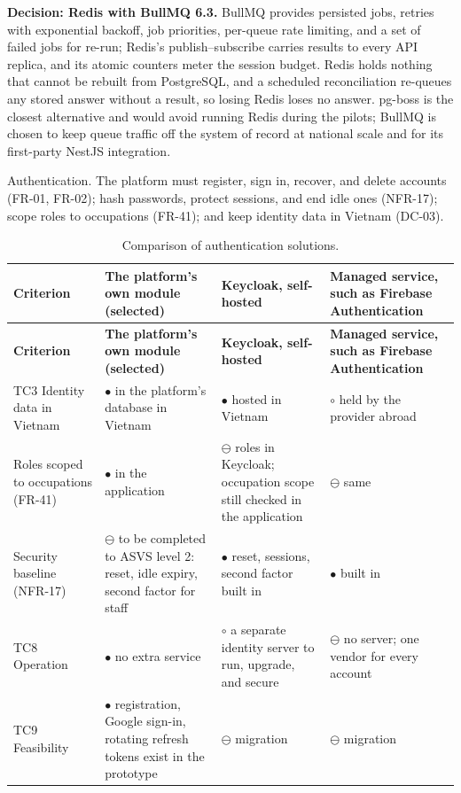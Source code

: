 \textbf{Decision: Redis with BullMQ 6.3.} BullMQ provides persisted jobs, retries with exponential backoff, job priorities, per-queue rate limiting, and a set of failed jobs for re-run\cite{r154}; Redis's publish--subscribe carries results to every API replica, and its atomic counters meter the session budget. Redis holds nothing that cannot be rebuilt from PostgreSQL, and a scheduled reconciliation re-queues any stored answer without a result, so losing Redis loses no answer. pg-boss is the closest alternative and would avoid running Redis during the pilots; BullMQ is chosen to keep queue traffic off the system of record at national scale and for its first-party NestJS integration.

Authentication. The platform must register, sign in, recover, and delete accounts (FR-01, FR-02); hash passwords, protect sessions, and end idle ones (NFR-17); scope roles to occupations (FR-41); and keep identity data in Vietnam (DC-03).

{\small
\begin{longtable}{|>{\raggedright\arraybackslash}p{}|>{\raggedright\arraybackslash}p{}|>{\raggedright\arraybackslash}p{}|>{\raggedright\arraybackslash}p{}|}
\caption{Comparison of authentication solutions.} \\
\hline
\textbf{Criterion} & \textbf{The platform's own module (selected)} & \textbf{Keycloak, self-hosted\cite{r186}} & \textbf{Managed service, such as Firebase Authentication\cite{r187}} \\ \hline
\endfirsthead
\hline
\textbf{Criterion} & \textbf{The platform's own module (selected)} & \textbf{Keycloak, self-hosted\cite{r186}} & \textbf{Managed service, such as Firebase Authentication\cite{r187}} \\ \hline
\endhead
TC3 Identity data in Vietnam & $\bullet$ in the platform's database in Vietnam & $\bullet$ hosted in Vietnam & $\circ$ held by the provider abroad \\ \hline
Roles scoped to occupations (FR-41) & $\bullet$ in the application & $\ominus$ roles in Keycloak; occupation scope still checked in the application & $\ominus$ same \\ \hline
Security baseline (NFR-17) & $\ominus$ to be completed to ASVS level 2\cite{r157}: reset, idle expiry, second factor for staff & $\bullet$ reset, sessions, second factor built in & $\bullet$ built in \\ \hline
TC8 Operation & $\bullet$ no extra service & $\circ$ a separate identity server to run, upgrade, and secure & $\ominus$ no server; one vendor for every account \\ \hline
TC9 Feasibility & $\bullet$ registration, Google sign-in, rotating refresh tokens exist in the prototype & $\ominus$ migration & $\ominus$ migration \\ \hline
\end{longtable}
}

